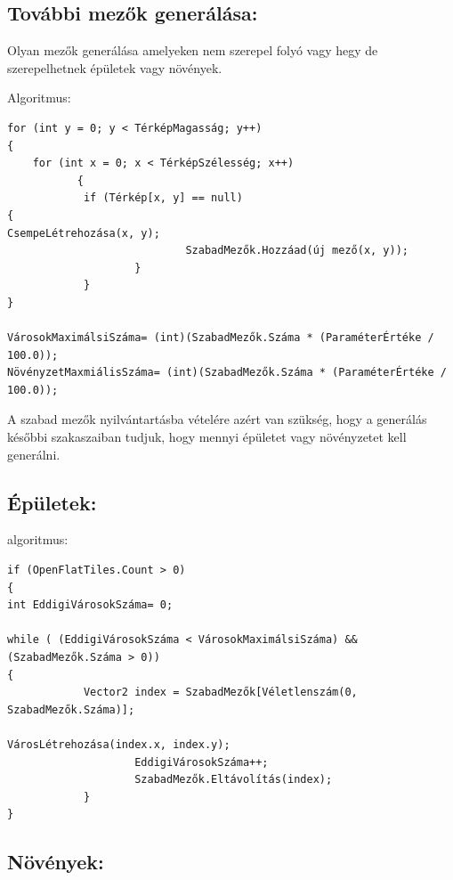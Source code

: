 \subsection{További mezők generálása:}

Olyan mezők generálása amelyeken nem szerepel folyó vagy hegy de szerepelhetnek épületek vagy növények.

Algoritmus:     

\begin{verbatim}
for (int y = 0; y < TérképMagasság; y++)
{
 	for (int x = 0; x < TérképSzélesség; x++)
           {
           	if (Térkép[x, y] == null)
{
CsempeLétrehozása(x, y);
                    		SzabadMezők.Hozzáad(új mező(x, y));
                	}
            }
}

VárosokMaximálsiSzáma= (int)(SzabadMezők.Száma * (ParaméterÉrtéke / 100.0));
NövényzetMaxmiálisSzáma= (int)(SzabadMezők.Száma * (ParaméterÉrtéke / 100.0));
\end{verbatim}

A szabad mezők nyilvántartásba vételére azért van szükség, hogy a generálás későbbi szakaszaiban tudjuk, hogy mennyi épületet vagy növényzetet kell generálni.

\subsection{Épületek:}

algoritmus:

\begin{verbatim}
if (OpenFlatTiles.Count > 0)
{
int EddigiVárosokSzáma= 0;
    
while ( (EddigiVárosokSzáma < VárosokMaximálsiSzáma) && (SzabadMezők.Száma > 0))
{
           	Vector2 index = SzabadMezők[Véletlenszám(0, SzabadMezők.Száma)];

VárosLétrehozása(index.x, index.y);
                	EddigiVárosokSzáma++;
                	SzabadMezők.Eltávolítás(index);
            }
}
\end{verbatim}

\subsection{Növények:}

